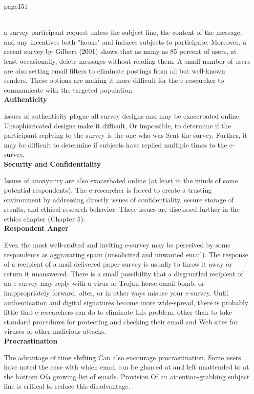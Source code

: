 \documentclass{book}
\begin{document}
page$151$\\\\\par
a survey participant request unless the subject line, the content of the message, and any incentives both "hooks" and induces subjects to participate. Moreover, a recent survey by Gilbert (2001) shows that as many as 85 percent of users, at least occasionally, delete messages without reading them. A small number of users are also setting email filters to eliminate postings from all but well-known senders. These options arc making it more difficult for the e-researcher to communicate with the targeted population.\\
\textbf{Authenticity}\par  Issues of authenticity plague all survey designs and may be exacerbated online. Unsophisricated designs make it difficult, Or impossible, to determine if the participant replying to the survey is the one who was Sent the survey. Further, it may be difficult to determine if subjects have replied multiple times to the e-survey.\\
\textbf{Security and Confidentiality}\par  Issues of anonymity are also exacerbated online (at least in the minds of some potential respondents). The e-researcher is forced to create a trusting environment by addressing directly issues of confidentiality, secure storage of results, and ethical research behavior. These issues are discussed further in the ethics chapter (Chapter 5).\\
\textbf{Respondent Anger}\par  Even the most well-crafted and inviting e-survey may be perceived by some respondents as aggravating spam (unsolicited and unwanted email). The response of a recipient of a mail delivered paper survey is usually to throw it away or return it unanswered. There is a small possibility that a disgruntled recipient of an e-survey may reply with a virus or Trojan horse email bomb, or inappropriately forward, alter, or in other ways misuse your e-survey. Until authentication and digital signatures become more wide-spread, there is probably little that e-researchers can do to eliminate this problem, other than to take standard procedures for protecting and checking their email and Web sites for viruses or other malicious attacks.\\
\textbf{Procrastination}\par  The advantage of time shifting Can also encourage procrastination. Some users have noted the ease with which email can be glanced at and left unattended to at the bottom Ofa growing list of emails. Provision Of an attention-grabbing subject line is critical to reduce this disadvantage.\\
\end{document}
